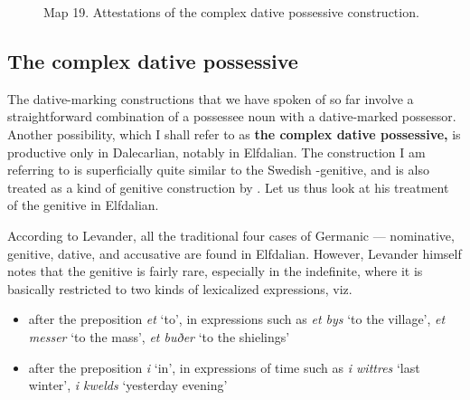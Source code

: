

\begin{figure}[h]

\begin{minipage}{3.9625in}

Map 19. Attestations of the complex dative possessive construction.


\end{minipage}

\end{figure}

\subsection{The complex dative possessive}
\label{bkm:Ref224373337}
The dative-marking constructions that we have spoken of so far involve a straightforward combination of a possessee noun with a dative-marked possessor. Another possibility, which I shall refer to as \textbf{the complex dative possessive,} is productive only in Dalecarlian, notably in Elfdalian. The construction I am referring to is superficially quite similar to the Swedish -genitive, and is also treated as a kind of genitive construction by \citet{Levander1909}. Let us thus look at his treatment of the genitive in Elfdalian.


According to Levander, all the traditional four cases of Germanic — nominative, genitive, dative, and accusative are found in Elfdalian. However, Levander himself notes that the genitive is fairly rare, especially in the indefinite, where it is basically restricted to two kinds of lexicalized expressions, viz. 

\begin{itemize}
\item after the preposition \textit{et} ‘to’, in expressions such as \textit{et bys} ‘to the village’, \textit{et messer} ‘to the mass’, \textit{et buðer} ‘to the shielings’
\item after the preposition \textit{i} ‘in’, in expressions of time such as \textit{i wittres} ‘last winter’, \textit{i kwelds }‘yesterday evening’
\end{itemize}

